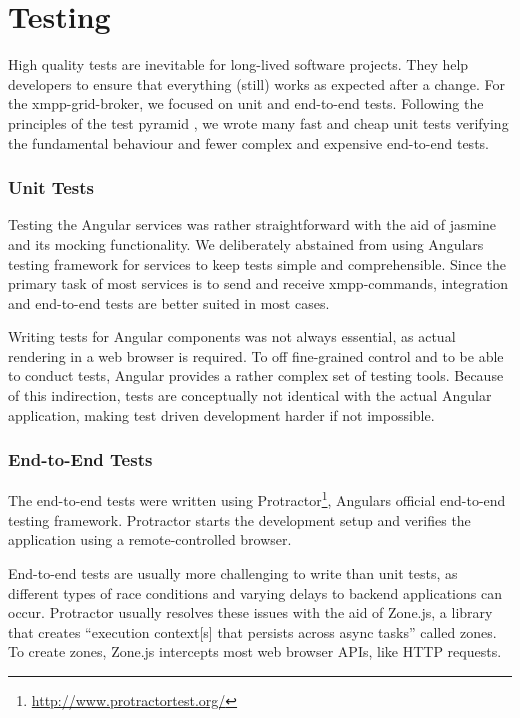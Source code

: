 \section{Testing}\label{sec:testing}

High quality tests are inevitable for long-lived software projects.
They help developers to ensure that everything (still) works as expected after a change.
For the \gls{xmpp-grid-broker}, we focused on unit and end-to-end tests.
Following the principles of the test pyramid \cite{Cohn:2009:SAS:1667109}, we wrote many fast and cheap unit tests verifying the fundamental behaviour and fewer complex and expensive end-to-end tests.

\subsubsection{Unit Tests}

Testing the Angular services was rather straightforward with the aid of jasmine and its mocking functionality.
We deliberately abstained from using Angulars testing framework for services to keep tests simple and comprehensible.
Since the primary task of most services is to send and receive \gls{xmpp}-commands, integration and end-to-end tests are better suited in most cases.

Writing tests for Angular components was not always essential, as actual rendering in a web browser is required.
To off fine-grained control and to be able to conduct tests, Angular provides a rather complex set of testing tools.
Because of this indirection, tests are conceptually not identical with the actual Angular application, making test driven development harder if not impossible.

\subsubsection{End-to-End Tests}

The end-to-end tests were written using Protractor\footnote{\url{http://www.protractortest.org/}}, Angulars official end-to-end testing framework.
Protractor starts the development setup and verifies the application using a remote-controlled browser.

End-to-end tests are usually more challenging to write than unit tests, as different types of race conditions and varying delays to backend applications can occur.
Protractor usually resolves these issues with the aid of Zone.js, a library that creates ``execution context[s] that persists across async tasks'' called zones.
To create zones, Zone.js intercepts most web browser APIs, like HTTP requests.~\cite{zone-js-readme}


